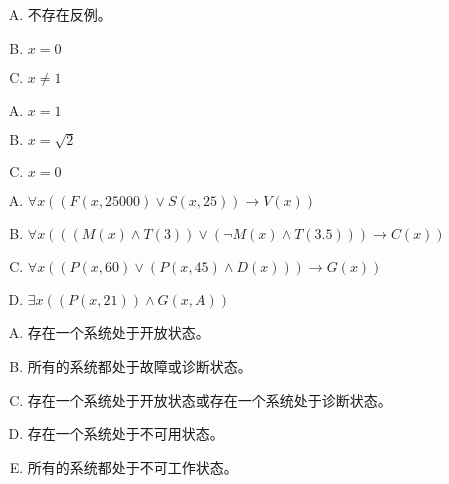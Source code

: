 {{        %
        \begin{practices}
            \begin{enumerate}[A.]
                \item 不存在反例。
                \item $x = 0$
                \item $x \neq 1$
            \end{enumerate}
        \end{practices}

        \begin{practices}
            \begin{enumerate}[A.]
                \item $x = 1$
                \item $x = \sqrt{2}$
                \item $x = 0$
            \end{enumerate}
        \end{practices}

        \begin{practices}
            \begin{enumerate}[A.]
                \item $\forall x ((F(x, 25000) \vee S(x, 25)) \rightarrow V(x))$
                \item $\forall x (((M(x) \wedge T(3)) \vee (\neg M(x) \wedge T(3.5))) \rightarrow C(x))$
                \item $\forall x ((P(x, 60) \vee (P(x, 45) \wedge D(x))) \rightarrow G(x))$
                \item $\exists x ((P(x, 21)) \wedge G(x, A))$
            \end{enumerate}
        \end{practices}

        \begin{practices}
            \begin{enumerate}[A.]
                \item 存在一个系统处于开放状态。
                \item 所有的系统都处于故障或诊断状态。
                \item 存在一个系统处于开放状态或存在一个系统处于诊断状态。
                \item 存在一个系统处于不可用状态。
                \item 所有的系统都处于不可工作状态。
            \end{enumerate}
        \end{practices}

}}

